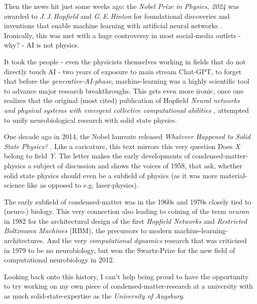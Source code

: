 Then the news hit just some weeks ago: the \emph{Nobel Prize in Physics, 2024} was awarded to \emph{J.\,J.\,Hopfield} and \emph{G.\,E.\,Hinton} \glqq for foundational discoveries and inventions that enable machine learning with artificial neural networks\grqq{} \cite{nobelPrizePhysics2024}.
Ironically, this was met with a huge controversy \cite{NobelPrizeControversy} in most social-media outlets - why? - \glqq AI is not physics\grqq.

It took the people - even the physicists themselves working in fields that do not directly touch AI - two years of exposure to main stream Chat-GPT, to forget that before the \emph{generative-AI-phase}, machine-learning was a highly scientific tool to advance major research breakthroughs.
This gets even more ironic, once one realizes that the original (most cited) publication of Hopfield \emph{\glqq Neural networks and physical systems with emergent collective computational abilities\grqq} \cite{basePaperMachineLearning}, attempted to unify neurobiological research with solid state physics. 

One decade ago in 2014, the Nobel laureate released \emph{\glqq Whatever Happened to Solid State Physics?\grqq} \cite{hopfieldConnectionToSolidStatePhysics}. 
Like a caricature, this text mirrors this very question \glqq Does \emph{X} belong to field \emph{Y}\grqq.
The letter makes the early developments of condensed-matter-physics a subject of discussion and shows the voices of 1958, that ask, whether solid state physics should even be a subfield of physics (as it was more material-science like as opposed to e.g. laser-physics).

The early subfield of condensed-matter was in the 1960s and 1970s closely tied to (neuro-) biology. 
This very connection also leading to coining of the term \emph{neuron} in 1982 for the architectural design of the first \emph{Hopfield Networks} and \emph{Restricted Boltzmann Machines} (RBM), the precursors to modern machine-learning-architectures.
And the very \emph{computational dynamics} research that was criticized in 1979 to be \glqq no neurobiology\grqq, but won the Swartz-Prize for the new field of computational neurobiology in 2012.

Looking back onto this history, I can't help being proud to have the opportunity to try working on my own piece of condensed-matter-research at a university with as much solid-state-expertise as the \emph{University of Augsburg}.